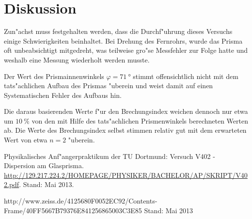 \section{Diskussion}
\label{sec:diskussion}
	Zun"achst muss festgehalten werden, dass die Durchf"uhrung dieses Versuchs einige Schwierigkeiten beinhaltet.
	Bei Drehung des Fernrohrs, wurde das Prisma oft unbeabsichtigt mitgedreht, was teilweise gro"se Messfehler zur Folge hatte und weshalb eine Messung wiederholt werden musste.
	
	Der Wert des Prismainnenwinkels $\varphi = \SI{71}{\degree}$ stimmt offensichtlich nicht mit dem tats"achlichen Aufbau des Prismas "uberein und weist damit auf einen Systematischen Fehler des Aufbaus hin.

	Die daraus basierenden Werte f"ur den Brechungsindex weichen dennoch nur etwa um $\SI{10}{\percent}$ von den mit Hilfe des tats"achlichen Prismenwinkels berechneten Werten ab.
	Die Werte des Brechungsindex selbst stimmen relativ gut mit dem erwarteten Wert von etwa $n = 2$ "uberein.


\begin{thebibliography}{9}
	 Physikalisches Anf"angerpraktikum der TU Dortmund: Versuch V402 - Dispersion am Glasprisma. \url{http://129.217.224.2/HOMEPAGE/PHYSIKER/BACHELOR/AP/SKRIPT/V402.pdf}. Stand: Mai 2013.

	 http://www.zeiss.de/4125680F0052EC92/Contents-Frame/40FF5667B79376E841256865003C3E85 Stand: Mai 2013
\end{thebibliography}
